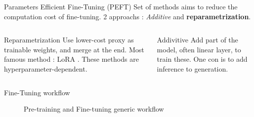 \begin{frame}{Parameters Efficient Fine-Tuning (PEFT)}
    Set of methods aims to reduce the computation cost of fine-tuning. 2 approachs : \textit{Additive} and \textbf{reparametrization}.



    
    \begin{columns}  
  
        \begin{column}[t]{0.45\textwidth}
        \begin{block}{Reparametrization}
            Use lower-cost proxy as trainable weights, and merge at the end. Most famous method : LoRA \cite{hu2021loralowrankadaptationlarge}. These methods are hyperparameter-dependent.
        \end{block}
        \end{column}
    
        \begin{column}[t]{0.45\textwidth}
        \begin{block}{Addivitive}
            Add part of the model, often linear layer, to train these.  One con is to add inference to generation.
            
        \end{block}
        \end{column}
      
    \end{columns}

\end{frame}


\begin{frame}{Fine-Tuning workflow}
    
    \begin{figure}
        \centering
        
        \caption{Pre-training and Fine-tuning generic workflow}
    \end{figure}  
        

    
\end{frame}

